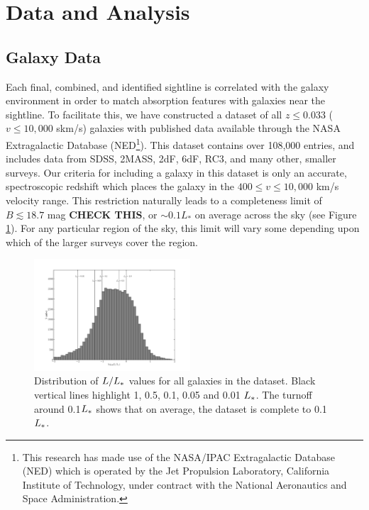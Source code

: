 \documentclass[iop]{emulateapj-rtx4}
\begin{document}
\section{Data and Analysis}

\subsection{Galaxy Data}
Each final, combined, and identified sightline is correlated with the galaxy environment in order to match absorption features with galaxies near the sightline. To facilitate this, we have constructed a dataset of all $z\leq 0.033$ ($v\leq 10,000$ skm/s) galaxies with published data available through the NASA Extragalactic Database (NED\footnote{This research has made use of the NASA/IPAC Extragalactic Database (NED) which is operated by the Jet Propulsion Laboratory, California Institute of Technology, under contract with the National Aeronautics and Space Administration.}). This dataset contains over 108,000 entries, and includes data from SDSS, 2MASS, 2dF, 6dF, RC3, and many other, smaller surveys. Our criteria for including a galaxy in this dataset is only an accurate, spectroscopic redshift which places the galaxy in the $400 \leq v \leq 10,000$ km/s velocity range. This restriction naturally leads to a completeness limit of $B \lesssim 18.7$ mag \textbf{CHECK THIS}, or $\sim0.1 L_*$ on average across the sky (see Figure \ref{completeness}). For any particular region of the sky, this limit will vary some depending upon which of the larger surveys cover the region. 

\begin{figure}[ht!]
        \centering
        \vspace{-10pt}
        \includegraphics[width=0.52\textwidth]{completeness_hist.pdf}
        \caption{\small{Distribution of $L/L_{\**}$ values for all galaxies in the dataset. Black vertical lines highlight 1, 0.5, 0.1, 0.05 and 0.01 $L_{\**}$. The turnoff around 0.1$L_{\**}$ shows that on average, the dataset is complete to 0.1$L_{\**}$.}}
        \label{completeness}
\end{figure} 
\end{document}
